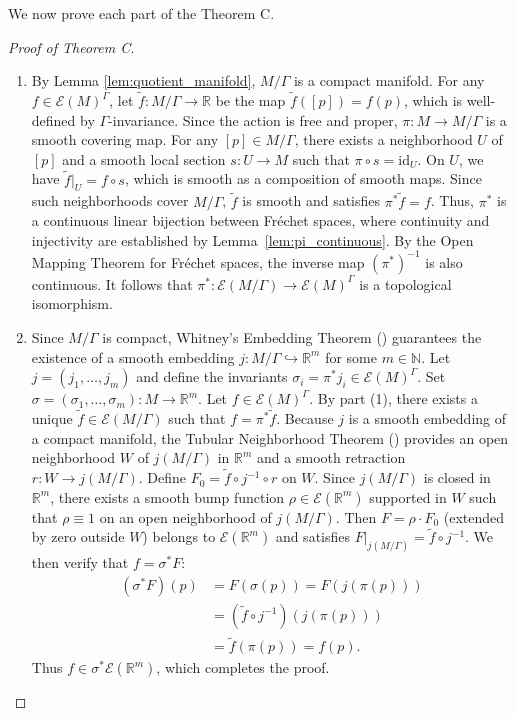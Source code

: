 \documentclass[]{article}
\begin{document}
	We now prove each part of the Theorem C.
\begin{proof}[Proof of Theorem C]
	\begin{enumerate}
	   \item By Lemma \ref{lem:quotient_manifold}, $M/\Gamma$ is a compact manifold. 
	   For any $f \in \mathcal{E}(M)^\Gamma$, let $\tilde{f}: M/\Gamma \to \mathbb{R}$ be the map $\tilde{f}([p]) = f(p)$, which is well-defined by $\Gamma$-invariance.
	   Since the action is free and proper, $\pi: M \to M/\Gamma$ is a smooth covering map. 
	   For any $[p] \in M/\Gamma$, there exists a neighborhood $U$ of $[p]$ and a smooth local section $s: U \to M$ such that $\pi \circ s = \mathrm{id}_U$. 
	   On $U$, we have $\tilde{f}|_U = f \circ s$, which is smooth as a composition of smooth maps. 
	   Since such neighborhoods cover $M/\Gamma$, $\tilde{f}$ is smooth and satisfies $\pi^*\tilde{f} = f$.
	   Thus, $\pi^*$ is a continuous linear bijection between Fréchet spaces, where continuity and injectivity are established by Lemma~\ref{lem:pi_continuous}. By the Open Mapping Theorem for Fréchet spaces, the inverse map $(\pi^*)^{-1}$ is also continuous. It follows that $\pi^*: \mathcal{E}(M/\Gamma) \to \mathcal{E}(M)^\Gamma$ is a topological isomorphism.
		
		\item Since $M/\Gamma$ is compact, Whitney's Embedding Theorem (\cite[Theorem 6.14]{Lee2012}) guarantees the existence of a smooth embedding $j: M/\Gamma \hookrightarrow \mathbb{R}^m$ for some $m \in \mathbb{N}$. Let $j = (j_1, \ldots, j_m)$ and define the invariants $\sigma_i = \pi^* j_i \in \mathcal{E}(M)^\Gamma$. Set $\sigma = (\sigma_1, \ldots, \sigma_m): M \to \mathbb{R}^m$.
		Let $f \in \mathcal{E}(M)^\Gamma$. By part (1), there exists a unique $\tilde{f} \in \mathcal{E}(M/\Gamma)$ such that $f = \pi^* \tilde{f}$. Because $j$ is a smooth embedding of a compact manifold, the Tubular Neighborhood Theorem (\cite[Theorems 6.17 and 6.18]{Lee2012}) provides an open neighborhood $W$ of $j(M/\Gamma)$ in $\mathbb{R}^m$ and a smooth retraction $r: W \to j(M/\Gamma)$.
		Define $F_0 = \tilde{f} \circ j^{-1} \circ r$ on $W$. Since $j(M/\Gamma)$ is closed in $\mathbb{R}^m$, there exists a smooth bump function $\rho \in \mathcal{E}(\mathbb{R}^m)$ supported in $W$ such that $\rho \equiv 1$ on an open neighborhood of $j(M/\Gamma)$. Then $F = \rho \cdot F_0$ (extended by zero outside $W$) belongs to $\mathcal{E}(\mathbb{R}^m)$ and satisfies $F|_{j(M/\Gamma)} = \tilde{f} \circ j^{-1}$. We then verify that $f = \sigma^* F$:
		\[\begin{aligned}
			(\sigma^* F)(p) &= F(\sigma(p)) = F(j(\pi(p))) \\
			&= (\tilde{f} \circ j^{-1})(j(\pi(p))) \\
			&= \tilde{f}(\pi(p)) = f(p).
		\end{aligned}
		\]
		Thus $f \in \sigma^* \mathcal{E}(\mathbb{R}^m)$, which completes the proof.
		

\end{enumerate}
\end{proof}
\end{document}
